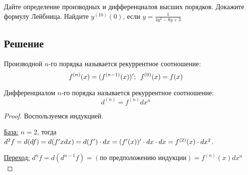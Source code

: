 Дайте определение производных и дифференциалов высших порядков. Докажите
формулу Лейбница. Найдите $y^{(10)}(0)$, если $y=\frac{1}{4y^2-8y+3}$

\subsection*{Решение}
\begin{definition}
    Производной $n$-го порядка называется рекуррентное соотношение:
        $$
        f^{(n)}(x) = (f^{(n-1)}(x))^{\prime}; \,\,\,
        f^{(0)}(x) = f(x)
        $$
\end{definition}

\begin{definition}
    Дифференциалом $n$-го порядка называется рекуррентное соотношение:
    $$
        d^{(n)} = f^{(n)}dx^{n}
    $$
\end{definition}
\begin{proof}
    Воспользуемся индукцией.

    \par\underline{База:} $n=2$, тогда $d^2f = d(df) =
    d(f^{\prime} x dx) = d(f^{\prime})\cdot dx = (f^{\prime}(x))^{\prime}\cdot dx\cdot dx =
    f^{(2)}(x)\cdot dx^2$.

    \par\underline{Переход:}
    $d^{n}f = d(d^{n-1}f) = (\text{по предположению индукции}) =
    f^{(n)}(x)dx^n$
\end{proof}

